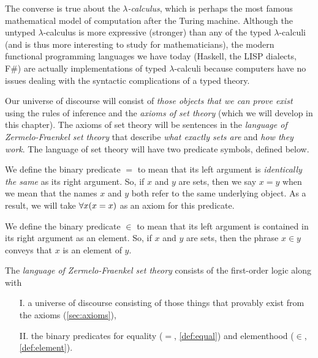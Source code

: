 \begin{note}
    The converse is true about the \emph{\(\lambda\)-calculus},
    which is perhaps the most famous mathematical model of computation after the Turing machine.
    Although the untyped \(\lambda\)-calculus is more expressive (\ie stronger)
    than any of the typed \(\lambda\)-calculi (and is thus more interesting to study for mathematicians),
    the modern functional programming languages we have today (\eg Haskell, the LISP dialects, F\#)
    are actually implementations of typed \(\lambda\)-calculi
    because computers have no issues dealing with the syntactic complications of a typed theory.
\end{note}

Our universe of discourse will consist of \emph{those objects that we can prove exist}
using the rules of inference and the \emph{axioms of set theory} (which we will develop in this chapter).
The axioms of set theory will be sentences in the \emph{language of Zermelo-Fraenkel set theory}
that describe \emph{what exactly sets are} and \emph{how they work}.
The language of set theory will have two predicate symbols, defined below.

\begin{definition}[Equality]\label{def:equal}
    We define the binary predicate \(=\) to mean that
    its left argument is \emph{identically the same} as its right argument.
    So, if \(x\) and \(y\) are sets, then we say \(x = y\)
    when we mean that the names \(x\) and \(y\) both refer to the same underlying object.
    As a result, we will take \(\forall x \pn*{x = x}\) as an axiom for this predicate.
\end{definition}

\begin{definition}[Elementhood]\label{def:element}
    We define the binary predicate \(\in\) to mean that its left argument is
    contained in its right argument as an element.
    So, if \(x\) and \(y\) are sets, then the phrase \(x \in y\)
    conveys that \(x\) is an element of \(y\).
\end{definition}

\begin{definition}
    The \emph{language of Zermelo-Fraenkel set theory}
    consists of the first-order logic
    along with
    \begin{enumerate}
        \item[I.]
            a universe of discourse consisting of
            those things that provably exist from the axioms (\autoref{sec:axioms}),
        \item[II.]
            the binary predicates for equality (\(=\), \autoref{def:equal})
            and elementhood (\(\in\), \autoref{def:element}).
    \end{enumerate}
\end{definition}

